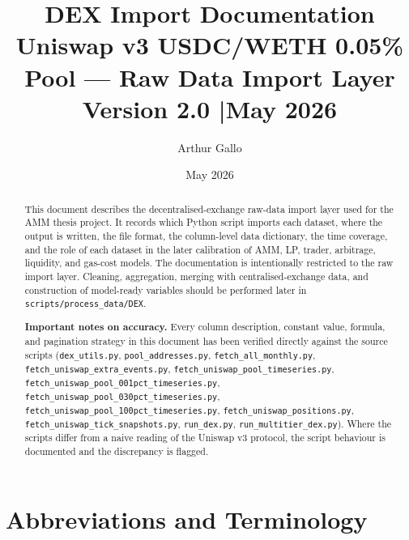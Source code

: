 \documentclass[11pt,a4paper]{article}
\title{\textbf{DEX Import Documentation}\\
\large Uniswap v3 USDC/WETH 0.05\% Pool --- Raw Data Import Layer\\[4pt]
\normalsize Version 2.0 \quad|\quad May 2026}
\author{Arthur Gallo}
\date{May 2026}
\begin{document}
\maketitle
\thispagestyle{fancy}

\begin{abstract}
This document describes the decentralised-exchange raw-data import layer used
for the AMM thesis project. It records which Python script imports each
dataset, where the output is written, the file format, the column-level data
dictionary, the time coverage, and the role of each dataset in the later
calibration of AMM, LP, trader, arbitrage, liquidity, and gas-cost models.
The documentation is intentionally restricted to the raw import layer.
Cleaning, aggregation, merging with centralised-exchange data, and
construction of model-ready variables should be performed later in
\texttt{scripts/process\_data/DEX}.

\medskip
\noindent\textbf{Important notes on accuracy.}
Every column description, constant value, formula, and pagination strategy in
this document has been verified directly against the source scripts
(\texttt{dex\_utils.py}, \texttt{pool\_addresses.py},
\texttt{fetch\_all\_monthly.py},
\texttt{fetch\_uniswap\_extra\_events.py},
\texttt{fetch\_uniswap\_pool\_timeseries.py},
\texttt{fetch\_uniswap\_pool\_001pct\_timeseries.py},
\texttt{fetch\_uniswap\_pool\_030pct\_timeseries.py},
\texttt{fetch\_uniswap\_pool\_100pct\_timeseries.py},
\texttt{fetch\_uniswap\_positions.py},
\texttt{fetch\_uniswap\_tick\_snapshots.py},
\texttt{run\_dex.py}, \texttt{run\_multitier\_dex.py}).
Where the scripts differ from a naive reading of the Uniswap v3 protocol,
the script behaviour is documented and the discrepancy is flagged.
\end{abstract}

\tableofcontents
\newpage

\section{Abbreviations and Terminology}
\label{sec:glossary}
\end{document}
